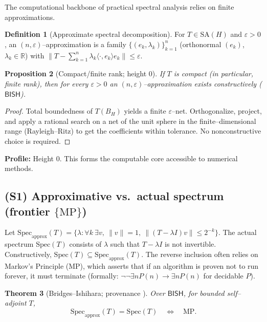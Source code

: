 \documentclass[11pt]{article}
\theoremstyle{plain}
\newtheorem{theorem}{Theorem}[section]
\newtheorem{proposition}[theorem]{Proposition}
\theoremstyle{definition}
\newtheorem{definition}[theorem]{Definition}
\theoremstyle{remark}
\newcommand{\R}{\mathbb{R}}
\newcommand{\BISH}{\mathsf{BISH}}
\newcommand{\MP}{\mathrm{MP}}
\begin{document}
The computational backbone of practical spectral analysis relies on finite approximations.

\begin{definition}[Approximate spectral decomposition]
For $T\in \mathrm{SA}(H)$ and $\varepsilon>0$, an $(n,\varepsilon)$--approximation is a family
$\{(e_k,\lambda_k)\}_{k=1}^n$ (orthonormal $(e_k)$, $\lambda_k\in\R$) with
$\big\|T - \sum_{k=1}^n \lambda_k \langle \cdot, e_k\rangle e_k\big\|\le \varepsilon$.
\end{definition}

\begin{proposition}[Compact/finite rank; height $0$]
If $T$ is compact (in particular, finite rank), then for every $\varepsilon>0$ an $(n,\varepsilon)$--approximation exists constructively ($\BISH$).
\end{proposition}

\begin{proof}
Total boundedness of $T(B_H)$ yields a finite $\varepsilon$--net. Orthogonalize, project, and apply a rational search on a net of the unit sphere in the finite--dimensional range (Rayleigh--Ritz) to get the coefficients within tolerance. No nonconstructive choice is required.
\end{proof}

\noindent\textbf{Profile:} Height 0. This forms the computable core accessible to numerical methods.

\subsection{(S1) Approximative vs.\ actual spectrum (frontier $\{\MP\}$)}
Let $\mathrm{Spec}_{\mathrm{approx}}(T)=\{\lambda:\forall k\ \exists v,\ \|v\|=1,\ \|(T-\lambda I)v\|\le 2^{-k}\}$.
The actual spectrum $\mathrm{Spec}(T)$ consists of $\lambda$ such that $T-\lambda I$ is not invertible.
Constructively, $\mathrm{Spec}(T) \subseteq \mathrm{Spec}_{\mathrm{approx}}(T)$. The reverse inclusion often relies on Markov's Principle ($\MP$), which asserts that if an algorithm is proven not to run forever, it must terminate (formally: $\neg\neg\exists n P(n) \to \exists n P(n)$ for decidable $P$).

\begin{theorem}[Bridges--Ishihara; provenance \cite{BridgesRichman}]
Over $\BISH$, for bounded self--adjoint $T$,
\[
\mathrm{Spec}_{\mathrm{approx}}(T)=\mathrm{Spec}(T)\quad \Longleftrightarrow\quad \MP.
\]
\end{theorem}
\end{document}

